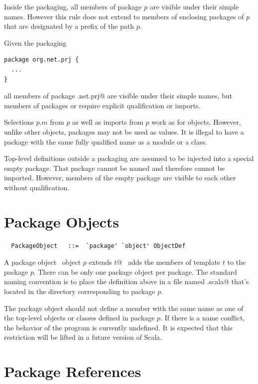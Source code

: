 Inside the packaging, all members of package $p$ are visible under their
simple names. However this rule does not extend to members of enclosing
packages of $p$ that are designated by a prefix of the path $p$.

\example Given the packaging
\begin{lstlisting}
package org.net.prj {
  ...
}
\end{lstlisting}
all members of package \lstinline@org.net.prj@ are visible under their
simple names, but members of packages  or  require
explicit qualification or imports.

Selections $p$.$m$ from $p$ as well as imports from $p$
work as for objects. However, unlike other objects, packages may not
be used as values. It is illegal to have a package with the same fully
qualified name as a module or a class.

Top-level definitions outside a packaging are assumed to be injected
into a special empty package. That package cannot be named and
therefore cannot be imported. However, members of the empty package
are visible to each other without qualification.

\section{Package Objects}
\label{sec:pkg-obj}

\syntax\begin{lstlisting}
  PackageObject   ::=  `package' `object' ObjectDef
\end{lstlisting}

A package object ~\lstinline@package object $p$ extends $t$@~ adds the
members of template $t$ to the package $p$. There can be only one
package object per package. The standard naming convention is to place
the definition above in a file named \lstinline@package.scala@ that's
located in the directory corresponding to package $p$.

The package object should not define a member with the same name as
one of the top-level objects or classes defined in package $p$. If
there is a name conflict, the behavior of the program is currently
undefined. It is expected that this restriction will be lifted in a
future version of Scala.

\section{Package References}


